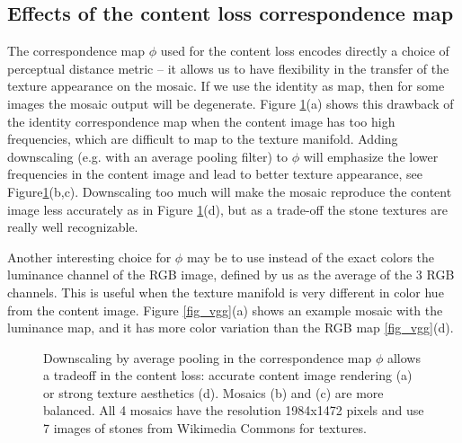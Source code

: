 \documentclass{article}
\begin{document}
\subsection{Effects of the content loss correspondence map}
\label{sec_ablation}
The correspondence map $\phi$ used for the content loss encodes directly a choice of perceptual distance metric -- it allows us to have flexibility in the transfer of the texture appearance on the mosaic. If we use the identity as map, then for some images the mosaic output will be degenerate. Figure \ref{fig_dsample}(a) shows this drawback of the identity correspondence map when the content image has too high frequencies, which are difficult to map to the texture manifold. Adding downscaling (e.g. with an average pooling filter) to  $\phi$ will emphasize the lower frequencies in the content image and lead to better texture appearance, see Figure\ref{fig_dsample}(b,c). Downscaling too much will make the mosaic reproduce the content image less accurately as in Figure \ref{fig_dsample}(d), but as a trade-off the stone textures are really well recognizable.

Another interesting choice for $\phi$ may be to use instead of the exact colors the luminance channel of the RGB image, defined by us as the average of the 3 RGB channels. This is useful when the texture manifold is very different in color hue from the content image. Figure \ref{fig_vgg}(a) shows an example mosaic with the luminance map, and it has more color variation than the RGB map \ref{fig_vgg}(d).

\begin{figure}[tb]
\centering
\caption{Downscaling by average pooling in the correspondence map $\phi$  allows a tradeoff in the content loss: accurate content image rendering (a) or strong texture aesthetics (d). Mosaics (b) and (c) are more balanced. All 4 mosaics have the resolution 1984x1472 pixels and use 7 images of stones from Wikimedia Commons for textures.}
\label{fig_dsample}
\end{figure}
\end{document}
